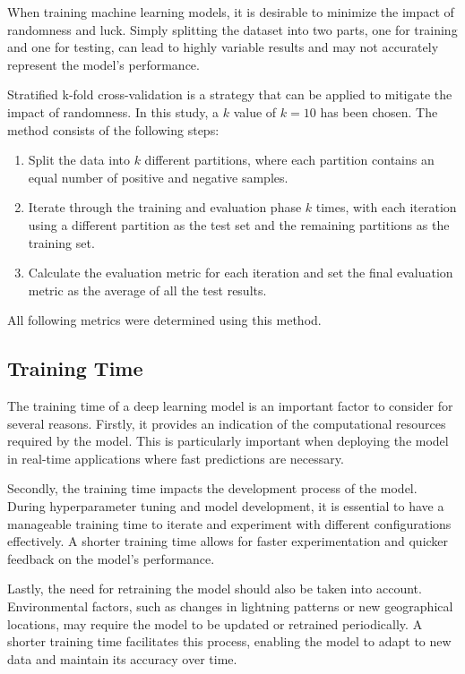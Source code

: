 When training machine learning models, it is desirable to minimize the impact of randomness and luck. Simply splitting the dataset into two parts, one for training and one for testing, can lead to highly variable results and may not accurately represent the model's performance.

Stratified k-fold cross-validation is a strategy that can be applied to mitigate the impact of randomness. In this study, a $k$ value of $k=10$ has been chosen. The method consists of the following steps:

\begin{enumerate}
	\item Split the data into $k$ different partitions, where each partition contains an equal number of positive and negative samples.
	\item Iterate through the training and evaluation phase $k$ times, with each iteration using a different partition as the test set and the remaining partitions as the training set.
	\item Calculate the evaluation metric for each iteration and set the final evaluation metric as the average of all the test results.
\end{enumerate}

All following metrics were determined using this method.

\subsection{Training Time}

The training time of a deep learning model is an important factor to consider for several reasons. Firstly, it provides an indication of the computational resources required by the model. This is particularly important when deploying the model in real-time applications where fast predictions are necessary. 

Secondly, the training time impacts the development process of the model. During hyperparameter tuning and model development, it is essential to have a manageable training time to iterate and experiment with different configurations effectively. A shorter training time allows for faster experimentation and quicker feedback on the model's performance.

Lastly, the need for retraining the model should also be taken into account. Environmental factors, such as changes in lightning patterns or new geographical locations, may require the model to be updated or retrained periodically. A shorter training time facilitates this process, enabling the model to adapt to new data and maintain its accuracy over time.


